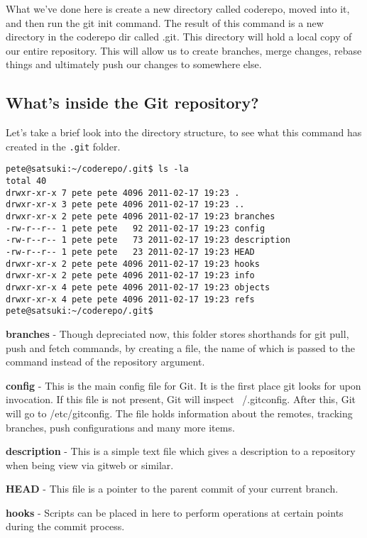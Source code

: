 What we've done here is create a new directory called coderepo, moved into it, and then run the git init command.  The result of this command is a new directory in the coderepo dir called .git.  This directory will hold a local copy of our entire repository.  This will allow us to create branches, merge changes, rebase things and ultimately push our changes to somewhere else.


\subsection*{What's inside the Git repository?}

Let's take a brief look into the directory structure, to see what this command has created in the \texttt{.git} folder.

\begin{verbatim} 
pete@satsuki:~/coderepo/.git$ ls -la 
total 40 
drwxr-xr-x 7 pete pete 4096 2011-02-17 19:23 . 
drwxr-xr-x 3 pete pete 4096 2011-02-17 19:23 .. 
drwxr-xr-x 2 pete pete 4096 2011-02-17 19:23 branches 
-rw-r--r-- 1 pete pete   92 2011-02-17 19:23 config 
-rw-r--r-- 1 pete pete   73 2011-02-17 19:23 description 
-rw-r--r-- 1 pete pete   23 2011-02-17 19:23 HEAD 
drwxr-xr-x 2 pete pete 4096 2011-02-17 19:23 hooks 
drwxr-xr-x 2 pete pete 4096 2011-02-17 19:23 info 
drwxr-xr-x 4 pete pete 4096 2011-02-17 19:23 objects 
drwxr-xr-x 4 pete pete 4096 2011-02-17 19:23 refs 
pete@satsuki:~/coderepo/.git$ 
\end{verbatim} 

\textbf{branches} - Though depreciated now, this folder stores shorthands for git pull, push and fetch commands, by creating a file, the name of which is passed to the command instead of the repository argument.

\textbf{config} - This is the main config file for Git.  It is the first place git looks for upon invocation.  If this file is not present, Git will inspect ~/.gitconfig.  After this, Git will go to /etc/gitconfig.  The file holds information about the remotes, tracking branches, push configurations and many more items.

\textbf{description} - This is a simple text file which gives a description to a repository when being view via gitweb or similar.

\textbf{HEAD} - This file is a pointer to the parent commit of your current branch.

\textbf{hooks} - Scripts can be placed in here to perform operations at certain points during the commit process.

